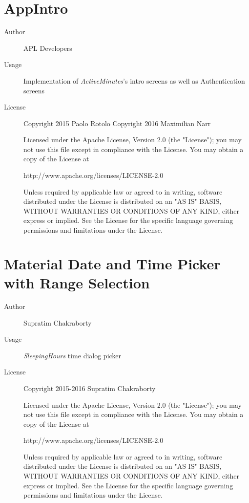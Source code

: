 \section*{AppIntro}
\begin{description}
    \item[Author] APL Developers
    \item[Usage] Implementation of \textit{ActiveMinutes}'s intro screens as well as Authentication screens
    \item[License]  Copyright 2015 Paolo Rotolo
   Copyright 2016 Maximilian Narr
   
    Licensed under the Apache License, Version 2.0 (the "License");
   you may not use this file except in compliance with the License.
   You may obtain a copy of the License at

       http://www.apache.org/licenses/LICENSE-2.0

   Unless required by applicable law or agreed to in writing, software
   distributed under the License is distributed on an "AS IS" BASIS,
   WITHOUT WARRANTIES OR CONDITIONS OF ANY KIND, either express or implied.
   See the License for the specific language governing permissions and
   limitations under the License.

\end{description}

\section*{Material Date and Time Picker with Range Selection}
\begin{description}
    \item[Author] Supratim Chakraborty
    \item[Usage] \textit{SleepingHours} time dialog picker
    \item[License]  Copyright 2015-2016 Supratim Chakraborty

   Licensed under the Apache License, Version 2.0 (the "License");
   you may not use this file except in compliance with the License.
   You may obtain a copy of the License at

       http://www.apache.org/licenses/LICENSE-2.0

   Unless required by applicable law or agreed to in writing, software
   distributed under the License is distributed on an "AS IS" BASIS,
   WITHOUT WARRANTIES OR CONDITIONS OF ANY KIND, either express or implied.
   See the License for the specific language governing permissions and
   limitations under the License.

\end{description}


